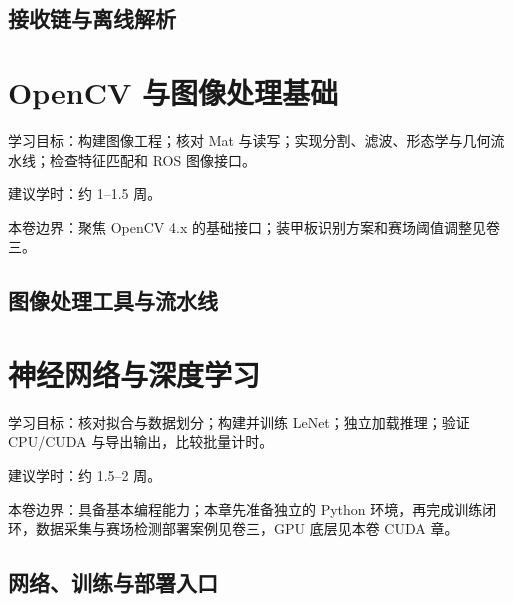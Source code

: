 \documentclass[
  lang=cn,
  scheme=chinese,
  chinesefont=ctexfont,
  11pt,
  oneside,
  device=normal,
  color=cyan,
  mode=fancy
]{elegantbook}
\begin{document}
\section{接收链与离线解析}





\chapter{OpenCV 与图像处理基础}

\begin{introduction}
  \item 学习目标：构建图像工程；核对 Mat 与读写；实现分割、滤波、形态学与几何流水线；检查特征匹配和 ROS 图像接口。
  \item 建议学时：约 1--1.5 周。
  \item 本卷边界：聚焦 OpenCV 4.x 的基础接口；装甲板识别方案和赛场阈值调整见卷三。
\end{introduction}

\section{图像处理工具与流水线}





\chapter{神经网络与深度学习}

\begin{introduction}
  \item 学习目标：核对拟合与数据划分；构建并训练 LeNet；独立加载推理；验证 CPU/CUDA 与导出输出，比较批量计时。
  \item 建议学时：约 1.5--2 周。
  \item 本卷边界：具备基本编程能力；本章先准备独立的 Python 环境，再完成训练闭环，数据采集与赛场检测部署案例见卷三，GPU 底层见本卷 CUDA 章。
\end{introduction}

\section{网络、训练与部署入口}
\end{document}
